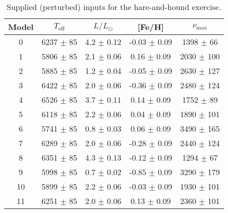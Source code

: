 {%
\begin{table} \centering %
\caption{Supplied (perturbed) inputs for the hare-and-hound exercise. \label{tab:hnh-perturb}}
\begin{tabular}{ccccc}
Model & $T_{\text{eff}}$ & $L/L_\odot$ & [Fe/H] & $\nu_{\max}$ \\ \hline\hline
 0 & 6237 $\pm$ 85 & 4.2 $\pm$ 0.12 & -0.03 $\pm$ 0.09 & 1398 $\pm$  66 \\
 1 & 5806 $\pm$ 85 & 2.1 $\pm$ 0.06 &  0.16 $\pm$ 0.09 & 2030 $\pm$ 100 \\
 2 & 5885 $\pm$ 85 & 1.2 $\pm$ 0.04 & -0.05 $\pm$ 0.09 & 2630 $\pm$ 127 \\
 3 & 6422 $\pm$ 85 & 2.0 $\pm$ 0.06 & -0.36 $\pm$ 0.09 & 2480 $\pm$ 124 \\
 4 & 6526 $\pm$ 85 & 3.7 $\pm$ 0.11 &  0.14 $\pm$ 0.09 & 1752 $\pm$  89 \\
 5 & 6118 $\pm$ 85 & 2.2 $\pm$ 0.06 &  0.04 $\pm$ 0.09 & 1890 $\pm$ 101 \\
 6 & 5741 $\pm$ 85 & 0.8 $\pm$ 0.03 &  0.06 $\pm$ 0.09 & 3490 $\pm$ 165 \\
 7 & 6289 $\pm$ 85 & 2.0 $\pm$ 0.06 & -0.28 $\pm$ 0.09 & 2440 $\pm$ 124 \\
 8 & 6351 $\pm$ 85 & 4.3 $\pm$ 0.13 & -0.12 $\pm$ 0.09 & 1294 $\pm$  67 \\
 9 & 5998 $\pm$ 85 & 0.7 $\pm$ 0.02 & -0.85 $\pm$ 0.09 & 3290 $\pm$ 179 \\
10 & 5899 $\pm$ 85 & 2.2 $\pm$ 0.06 & -0.03 $\pm$ 0.09 & 1930 $\pm$ 101 \\
11 & 6251 $\pm$ 85 & 2.0 $\pm$ 0.06 &  0.13 $\pm$ 0.09 & 2360 $\pm$ 101
\\ \hline \end{tabular}
\end{table}
}
\clearpage
